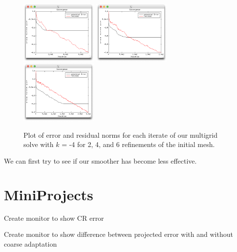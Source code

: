 \begin{refsection}
\begin{figure}
\centering
\includegraphics[width=1.5in]{figures/errorAnisoK4_r2.png}\hfil
\includegraphics[width=1.5in]{figures/errorAnisoK4_r4.png}\hfil
\includegraphics[width=1.5in]{figures/errorAnisoK4_r6.png}
\caption{Plot of error and residual norms for each iterate of our multigrid solve with $k$ = -4 for 2, 4, and 6 refinements of the initial mesh.\label{fig:errorAnisoN}}
\end{figure}

We can first try to see if our smoother has become less effective.

\section{MiniProjects}

Create monitor to show CR error

Create monitor to show difference between projected error with and without coarse adaptation

\printbibliography[heading=subbibliography] %
\end{refsection}
